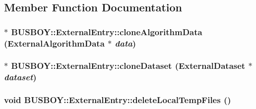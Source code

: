 \subsection{Member Function Documentation}
\hypertarget{classBUSBOY_1_1ExternalEntry_af82edeccb112045ee6e28fe1e29df19b}{
\subsubsection[{cloneAlgorithmData}]{ $\ast$ BUSBOY::ExternalEntry::cloneAlgorithmData ({\bf ExternalAlgorithmData} $\ast$ {\em data})}}
\label{classBUSBOY_1_1ExternalEntry_af82edeccb112045ee6e28fe1e29df19b}
\hypertarget{classBUSBOY_1_1ExternalEntry_adee2166838562c387c1e215771ac917b}{
\subsubsection[{cloneDataset}]{ $\ast$ BUSBOY::ExternalEntry::cloneDataset ({\bf ExternalDataset} $\ast$ {\em dataset})}}
\label{classBUSBOY_1_1ExternalEntry_adee2166838562c387c1e215771ac917b}
\hypertarget{classBUSBOY_1_1ExternalEntry_a4746165d3329bb8e09cf0a94f9e4b037}{
\subsubsection[{deleteLocalTempFiles}]{\setlength{\rightskip}{0pt plus 5cm}void BUSBOY::ExternalEntry::deleteLocalTempFiles ()}}
\label{classBUSBOY_1_1ExternalEntry_a4746165d3329bb8e09cf0a94f9e4b037}


